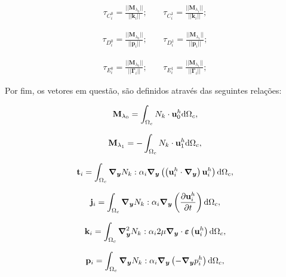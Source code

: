 \documentclass[tese_patricia]{subfiles}
\begin{document}
\begin{align}
	\tau_{C_i^{0}} = \frac{|| \mathbf{M}_{\lambda_0} || }{||\mathbf{k}_{i} ||}; \ \ \ \ \  & \tau_{C_i^{1}} = \frac{|| \mathbf{M}_{\lambda_1} || }{||\mathbf{k}_{i} ||};
\end{align}


\begin{align}
	\tau_{D_i^{0}} = \frac{|| \mathbf{M}_{\lambda_0} || }{||\mathbf{p}_{i} ||}; \ \ \ \ \  & \tau_{D_i^{1}} = \frac{|| \mathbf{M}_{\lambda_1} || }{||\mathbf{p}_{i} ||}; 
\end{align}


\begin{align}
	\tau_{E_i^{0}} = \frac{|| \mathbf{M}_{\lambda_0} || }{||\mathbf{\Gamma}_{i} ||}; \ \ \ \ \  & \tau_{E_i^{1}} = \frac{|| \mathbf{M}_{\lambda_1} || }{||\mathbf{\Gamma}_{i} ||};
\end{align}

Por fim, os vetores em questão, são definidos através das seguintes relações:


\begin{align}
	\mathbf{M}_{\lambda_0} = \int_{\Omega_c} N_{k} \cdot \mathbf{u}_0^h \mathrm{d} \Omega_c,
\end{align}

\begin{align}
	\mathbf{M}_{\lambda_1} = - \int_{\Omega_c} N_{k} \cdot \mathbf{u}_1^h \mathrm{d} \Omega_c,
\end{align}

\begin{align}
	\mathbf{t}_{i} = \int_{\Omega_c} \boldsymbol{\nabla_y} N_{k} : \alpha_i \boldsymbol{\nabla_y} \left( \left( \mathbf{u}_i^{h} \cdot  \boldsymbol{\nabla_y} \right) \mathbf{u}_i^{h} \right)  \mathrm{d} \Omega_c,
\end{align}

\begin{align}
	\mathbf{j}_{i} = \int_{\Omega_c} \boldsymbol{\nabla_y} N_{k} :  \alpha_i \boldsymbol{\nabla_y} \left(\frac{\partial\mathbf{u}_i^{h}}{\partial t}  \right)  \mathrm{d} \Omega_c,
\end{align}

\begin{align}
	\mathbf{k}_{i} = \int_{\Omega_c} \boldsymbol{\nabla_y}^{2} N_{k} : \alpha_i 2 \mu \boldsymbol{\nabla_y} \cdot \bm{\varepsilon} \left(\mathbf{u}_i^{h}\right)    \mathrm{d} \Omega_c,
\end{align}

\begin{align}
	\mathbf{p}_{i} = \int_{\Omega_c} \boldsymbol{\nabla_y} N_{k} : \alpha_i \boldsymbol{\nabla_y} \left(-\boldsymbol{\nabla_y} p_i^{h} \right)    \mathrm{d} \Omega_c,
\end{align}
\end{document}
